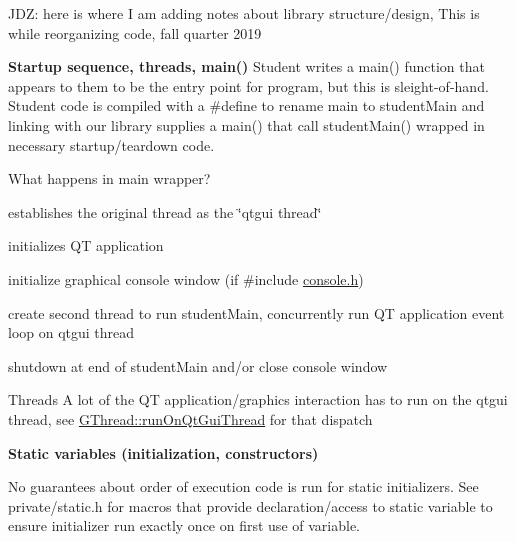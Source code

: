J\+DZ\+: here is where I am adding notes about library structure/design, This is while reorganizing code, fall quarter 2019

{\bfseries Startup sequence, threads, main()} Student writes a main() function that appears to them to be the entry point for program, but this is sleight-\/of-\/hand. Student code is compiled with a \#define to rename main to student\+Main and linking with our library supplies a main() that call student\+Main() wrapped in necessary startup/teardown code.
\begin{DoxyItemize}
\item What happens in main wrapper?
\begin{DoxyEnumerate}
\item establishes the original thread as the \char`\"{}qtgui thread\char`\"{}
\item initializes QT application
\item initialize graphical console window (if \#include \mbox{\hyperlink{console_8h_source}{console.\+h}})
\item create second thread to run student\+Main, concurrently run QT application event loop on qtgui thread
\item shutdown at end of student\+Main and/or close console window
\end{DoxyEnumerate}
\item Threads A lot of the QT application/graphics interaction has to run on the qtgui thread, see \mbox{\hyperlink{classGThread_a33da0c87717269710ac7a564a1ebbe64}{G\+Thread\+::run\+On\+Qt\+Gui\+Thread}} for that dispatch
\end{DoxyItemize}

{\bfseries Static variables (initialization, constructors)}
\begin{DoxyItemize}
\item No guarantees about order of execution code is run for static initializers. See private/static.\+h for macros that provide declaration/access to static variable to ensure initializer run exactly once on first use of variable. 
\end{DoxyItemize}